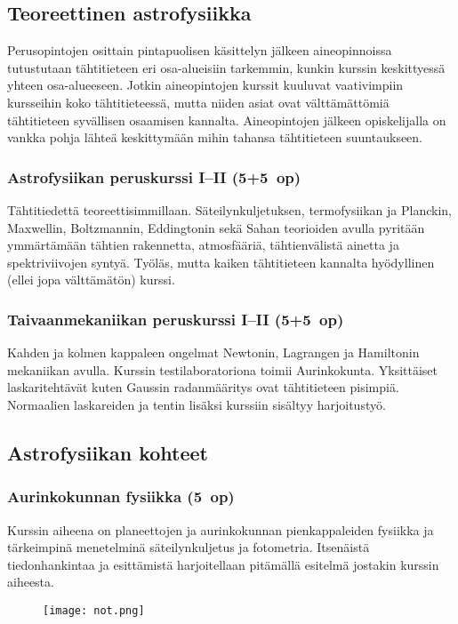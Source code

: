 \documentclass[../ala_hataile.tex]{subfiles}
\begin{document}
\subsection*{Teoreettinen astrofysiikka}
Perusopintojen osittain pintapuolisen
käsittelyn jälkeen aineopinnoissa tutustutaan
tähtitieteen eri osa-alueisiin tarkemmin, kunkin kurssin keskittyessä yhteen
osa-alueeseen. Jotkin aineopintojen kurssit
kuuluvat vaativimpiin kursseihin koko tähtitieteessä,
mutta niiden asiat ovat välttämättömiä
tähtitieteen syvällisen osaamisen
kannalta. Aineopintojen jälkeen opiskelijalla
on vankka pohja lähteä keskittymään
mihin tahansa tähtitieteen suuntaukseen.

\subsubsection*{Astrofysiikan peruskurssi I--II (5+5~op)}
Tähtitiedettä teoreettisimmillaan. Säteilynkuljetuksen,
termofysiikan ja Planckin,
Maxwellin, Boltzmannin, Eddingtonin
sekä Sahan teorioiden avulla pyritään ymmärtämään
tähtien rakennetta, atmosfääriä,
tähtienvälistä ainetta ja spektriviivojen
syntyä. Työläs, mutta kaiken tähtitieteen
kannalta hyödyllinen (ellei jopa välttämätön)
kurssi.

\subsubsection*{Taivaanmekaniikan peruskurssi I--II (5+5~op)}
Kahden ja kolmen kappaleen ongelmat
Newtonin, Lagrangen ja Hamiltonin mekaniikan
avulla. Kurssin testilaboratoriona
toimii Aurinkokunta. Yksittäiset laskaritehtävät
kuten Gaussin radanmääritys ovat
tähtitieteen pisimpiä. Normaalien laskareiden ja tentin lisäksi kurssiin sisältyy harjoitustyö.
\subsection*{Astrofysiikan kohteet}
\subsubsection*{Aurinkokunnan fysiikka (5~op)}
Kurssin aiheena on planeettojen ja aurinkokunnan
pienkappaleiden fysiikka ja
tärkeimpinä menetelminä säteilynkuljetus
ja fotometria. Itsenäistä tiedonhankintaa ja
esittämistä harjoitellaan pitämällä esitelmä
jostakin kurssin aiheesta.
\begin{figure}[b]
	\texttt{[image: not.png]}
\end{figure}
\end{document}
